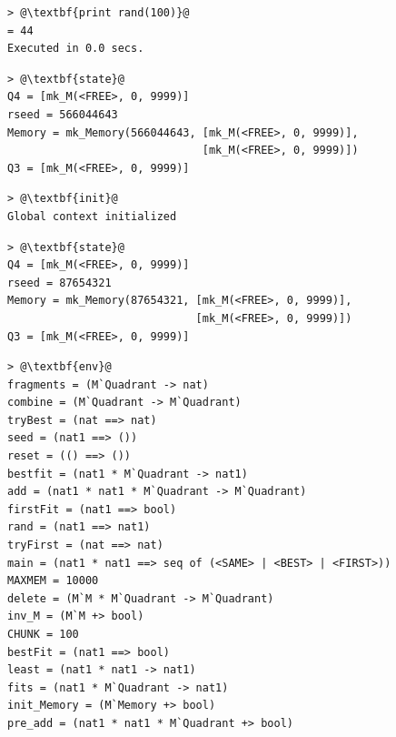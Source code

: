\documentclass{overturerepchap}
\begin{document}
\begin{lstlisting}[escapechar=@]
> @\textbf{print rand(100)}@
= 44
Executed in 0.0 secs.
\end{lstlisting}

\begin{lstlisting}[escapechar=@]
> @\textbf{state}@
Q4 = [mk_M(<FREE>, 0, 9999)]
rseed = 566044643
Memory = mk_Memory(566044643, [mk_M(<FREE>, 0, 9999)],
                              [mk_M(<FREE>, 0, 9999)])
Q3 = [mk_M(<FREE>, 0, 9999)]
\end{lstlisting}

\begin{lstlisting}[escapechar=@]
> @\textbf{init}@
Global context initialized
\end{lstlisting}

\begin{lstlisting}[escapechar=@]
> @\textbf{state}@
Q4 = [mk_M(<FREE>, 0, 9999)]
rseed = 87654321
Memory = mk_Memory(87654321, [mk_M(<FREE>, 0, 9999)],
                             [mk_M(<FREE>, 0, 9999)])
Q3 = [mk_M(<FREE>, 0, 9999)]
\end{lstlisting}



\begin{lstlisting}[escapechar=@]
> @\textbf{env}@
fragments = (M`Quadrant -> nat)
combine = (M`Quadrant -> M`Quadrant)
tryBest = (nat ==> nat)
seed = (nat1 ==> ())
reset = (() ==> ())
bestfit = (nat1 * M`Quadrant -> nat1)
add = (nat1 * nat1 * M`Quadrant -> M`Quadrant)
firstFit = (nat1 ==> bool)
rand = (nat1 ==> nat1)
tryFirst = (nat ==> nat)
main = (nat1 * nat1 ==> seq of (<SAME> | <BEST> | <FIRST>))
MAXMEM = 10000
delete = (M`M * M`Quadrant -> M`Quadrant)
inv_M = (M`M +> bool)
CHUNK = 100
bestFit = (nat1 ==> bool)
least = (nat1 * nat1 -> nat1)
fits = (nat1 * M`Quadrant -> nat1)
init_Memory = (M`Memory +> bool)
pre_add = (nat1 * nat1 * M`Quadrant +> bool)
\end{lstlisting}

\end{document}
